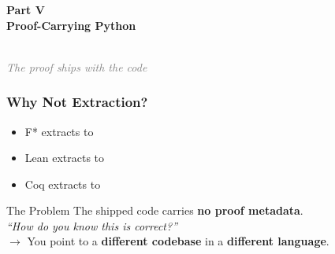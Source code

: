 
\begin{frame}
\frametitle{}
\vfill
\begin{center}
{\Large\textcolor{jugeoBlue}{\textbf{Part V}}}\\[6pt]
{\LARGE\textcolor{jugeoDark}{\textbf{Proof-Carrying Python}}}\\[10pt]
\\[10pt]
{\large\textit{\textcolor{gray}{The proof ships with the code}}}
\end{center}
\vfill
\end{frame}

\begin{frame}
\frametitle{Why Not Extraction?}
\begin{itemize}
  \item F* extracts to 
  \item Lean extracts to 
  \item Coq extracts to 
\end{itemize}
\vspace{8pt}
\begin{alertblock}{The Problem}
  The shipped code carries \textcolor{jugeoRed}{\textbf{no proof metadata}}.\\[4pt]
  \emph{``How do you know this is correct?''}\\
  $\longrightarrow$ You point to a \textbf{different codebase} in a \textbf{different language}.
\end{alertblock}
\end{frame}

